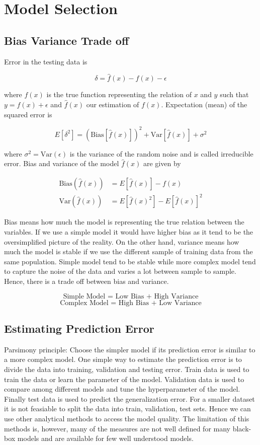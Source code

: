 \documentclass[11pt]{article}
\theoremstyle{definition}
\begin{document}
\newpage
\section{Model Selection}  


\subsection{Bias Variance Trade off }


Error in the testing data is 

$$
\delta = \hat{f}(x) - f(x) - \epsilon
$$

where $f(x)$ is the true function representing the relation of $x$ and $y$ such that $y = f(x) + \epsilon $ and $\hat{f}(x)$ our estimation of $f(x)$. Expectation (mean) of the squared error is 

$$
E\left[ \delta^2\right] = \left(\text{Bias}\left[\hat{f}(x)\right]\right)^2 + \text{Var}\left[\hat{f}(x)\right] + \sigma^2
$$

where $\sigma^2 = \text{Var}(\epsilon)$ is the variance of the random noise and is called irreducible error.  Bias and variance of the model $\hat{f}(x)$ are given by 

$$
\begin{align}
\text{Bias}(\hat{f}(x)) & = E[\hat{f}(x)]-f(x) \\
\text{Var}(\hat{f}(x)) & = E[\hat{f}(x)^2] - E[\hat{f}(x)]^2
\end{align}
$$

Bias means how much the model is representing the true relation between the variables. If we use a simple model it would have higher bias as it tend to be the oversimplified picture of the reality. On the other hand, variance means how much the model is stable if we use the different sample of training data from the same population. Simple model tend to be stable while more complex model tend to capture the noise of the data and varies a lot between sample to sample. Hence, there is a trade off between bias and variance. 

$$
\text{Simple Model = Low Bias + High Variance} 
$$
$$
\text{Complex Model = High Bias + Low Variance}
$$


\subsection{Estimating Prediction Error }

Parsimony principle: Choose the simpler model if its prediction error is similar to a more complex model. One simple way to estimate the prediction error is to divide the data into training, validation and testing error. Train data is used to train the data or learn the parameter of the model. Validation data is used to compare among different models and tune the hyperparameter of the model. Finally test data is used to predict the generalization error. For a smaller dataset it is not feasiable to split the data into train, validation, test sets. Hence we can use other analytical methods to access the model quality. The limitation of this methods is, however, many of the measures are not well defined for many black-box models and are available for few well understood models. 
\end{document}
